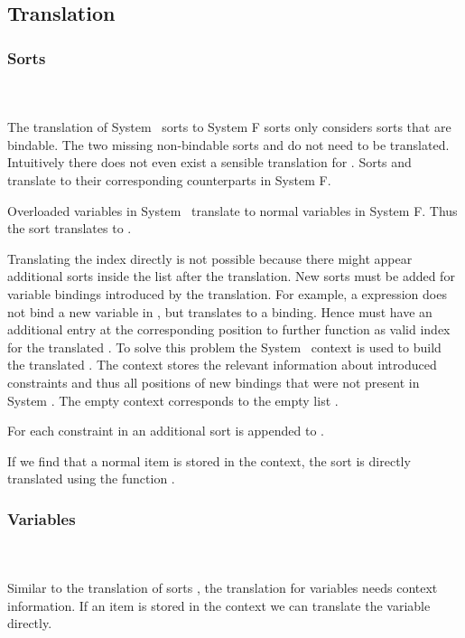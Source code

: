 \subsection{Translation}
\subsubsection{Sorts}\hfill\\\\
The translation of System \Fo\ sorts to System F sorts only considers sorts that are bindable. 
The two missing non-bindable sorts  and  do not need to be translated. 
Intuitively there does not even exist a sensible translation for .
\DPTSort
Sorts  and  translate to their corresponding counterparts in System F. 

\noindent  Overloaded variables in System \Fo\ translate to normal variables in System F. 
Thus the sort  translates to . 

\noindent Translating the index  directly is not possible because there might appear additional sorts inside the list after the translation. 
New sorts must be added for variable bindings introduced by the translation. 
For example, a    \Constr{=}    expression does not bind a new variable in , but translates to a     binding. 
Hence  must have an additional entry  at the corresponding position to further function as valid index for the translated . 
To solve this problem the System \Fo\ context  is used to build the translated . 
The context stores the relevant information about introduced constraints and thus all positions of new bindings that were not present in System \Fo. 
\DPTSorts
The empty context  corresponds to the empty list \Constr{[]}.

\noindent For each constraint in  an additional sort  is appended to .

\noindent If we find that a normal item is stored in the context, the sort  is directly translated using the function .

\subsubsection{Variables}\hfill\\\\
Similar to the translation of sorts , the translation for variables  needs context information.  
\DPTVar
If an item is stored in the context we can translate the variable directly. 

